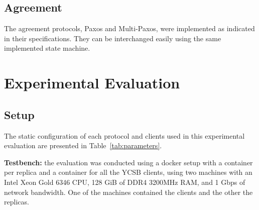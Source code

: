 \documentclass[sigconf]{acmart}
\begin{document}
\subsection{Agreement}

The agreement protocols, Paxos and Multi-Paxos, were implemented as indicated in their specifications. They can be interchanged easily using the same implemented state machine.


\section{Experimental Evaluation}

\subsection{Setup}

\begin{table}[h]
    \centering
    \caption{Protocol Parameters}
    \label{tab:parameters}
\end{table}

The static configuration of each protocol and clients used in this experimental evaluation are presented in Table~\ref{tab:parameters}.

\textbf{Testbench:} the evaluation was conducted using a docker setup with a container per replica and a container for all the YCSB clients, using two machines with an Intel Xeon Gold 6346 CPU, 128 GiB of DDR4 3200MHz RAM, and 1 Gbps of network bandwidth. One of the machines contained the clients and the other the replicas.
\end{document}

